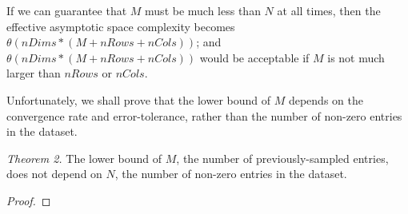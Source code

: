 If we can guarantee that $M$ must be much less than $N$ at all times, then the effective asymptotic space complexity becomes $\theta(nDims*(M+nRows+nCols))$; and 
$\theta(nDims*(M+nRows+nCols))$ would be acceptable if $M$ is not much larger than $nRows$ or $nCols$.

Unfortunately, we shall prove that the lower bound of $M$ depends on the convergence rate and error-tolerance, rather than the number of non-zero entries in the dataset.

\emph{Theorem 2.}
The lower bound of $M$, the number of previously-sampled entries, does not depend on $N$, the number of non-zero entries in the dataset.
\begin{proof}

\end{proof}

